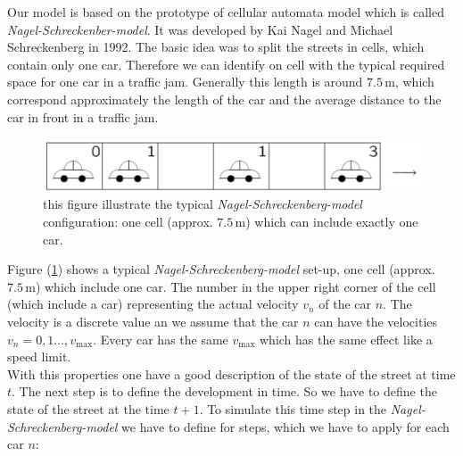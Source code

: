 \documentclass[11pt]{article}
\begin{document}
Our model is based on the prototype of cellular automata model which is called \textit{Nagel-Schreckenber-model}. It was developed by Kai Nagel and Michael Schreckenberg in 1992. The basic idea was to split the streets in cells, which contain only one car. Therefore we can identify on cell with the typical required space for one car in a traffic jam. Generally this length is around $7.5\,\mathrm{m}$, which correspond approximately the length of the car and the average distance to the car in front in a traffic jam.
\begin{figure}[h!]
\includegraphics[width=\textwidth]{ns_config.png}
\caption{this figure illustrate the typical \textit{Nagel-Schreckenberg-model} configuration: one cell (approx. $7.5\,\mathrm{m}$) which can include exactly one car.\cite{theory}}
\label{ns_config} 
\end{figure}
Figure (\ref{ns_config}) shows a typical \textit{Nagel-Schreckenberg-model} set-up, one cell (approx. $7.5\,\mathrm{m}$) which include one car. The number in the upper right corner of the cell (which include a car) representing the actual velocity $v_n$ of the car $n$. The velocity is a discrete value an we assume that the car $n$ can have the velocities $v_n=0,1 \ldots ,v_{\mathrm{max}}$. Every car has the same $v_{\mathrm{max}}$ which has the same effect like a speed limit.\\
With this properties one have a good description of the state of the street at time $t$. The next step is to define the development in time. So we have to define the state of the street at the time $t+1$. To simulate this time step in the \textit{Nagel-Schreckenberg-model} we have to define for steps, which we have to apply for each car $n$:
\end{document}

